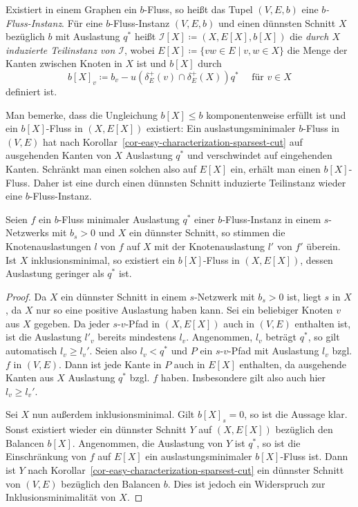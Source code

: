 
\begin{definition}
	Existiert in einem Graphen ein $b$-Fluss, so heißt das Tupel $(V, E, b)$ eine \emph{$b$-Fluss-Instanz}.
	Für eine $b$-Fluss-Instanz $(V, E, b)$ und einen dünnsten Schnitt $X$ bezüglich $b$ mit Auslastung $q^*$ heißt $\mathcal{I}[X] \coloneq (X, E[X], b[X])$ die \emph{durch $X$ induzierte Teilinstanz von $\mathcal{I}$},
	wobei $E[X] \coloneq \{ vw \in E \mid v, w \in X \}$ die Menge der Kanten zwischen Knoten in $X$ ist und $b[X]$ durch \[
	b[X]_v \coloneq b_v - u(\delta^+_E(v)\cap\delta^+_E(X)) q^* \text{~~~ für $v\in X$}
\] definiert ist.
\end{definition}

Man bemerke, dass die Ungleichung $b[X] \leq b$ komponentenweise erfüllt ist und ein $b[X]$-Fluss in $(X, E[X])$ existiert:
Ein auslastungsminimaler $b$-Fluss in $(V, E)$ hat nach Korollar~\ref{cor-easy-characterization-sparsest-cut} auf ausgehenden Kanten von $X$ Auslastung $q^*$ und verschwindet auf eingehenden Kanten.
Schränkt man einen solchen also auf $E[X]$ ein, erhält man einen $b[X]$-Fluss.
Daher ist eine durch einen dünnsten Schnitt induzierte Teilinstanz wieder eine  $b$-Fluss-Instanz.

\begin{proposition}\label{prop-restricted-minimal-flow-is-b-flow-on-induced-instance}
	Seien $f$ ein $b$-Fluss minimaler Auslastung $q^*$ einer $b$-Fluss-Instanz in einem $s$-Netzwerks mit $b_s > 0$ und $X$ ein dünnster Schnitt, so stimmen die Knotenauslastungen $l$ von $f$ auf $X$ mit der Knotenauslastung $l'$ von $f'$ überein.
	Ist $X$ inklusionsminimal, so existiert ein $b[X]$-Fluss in $(X, E[X])$, dessen Auslastung geringer als $q^*$ ist.
\end{proposition}
\begin{proof}
	Da $X$ ein dünnster Schnitt in einem $s$-Netzwerk mit $b_s > 0$ ist, liegt $s$ in $X$, da $X$ nur so eine positive Auslastung haben kann.
	Sei ein beliebiger Knoten $v$ aus $X$ gegeben.
	Da jeder $s$-$v$-Pfad in $(X, E[X])$ auch in $(V, E)$ enthalten ist, ist die Auslastung $l'_v$ bereits mindestens $l_v$.
	Angenommen, $l_v$ beträgt $q^*$, so gilt automatisch $l_v \geq l_v'$.
	Seien also $l_v < q^*$ und $P$ ein $s$-$v$-Pfad mit Auslastung $l_v$ bzgl. $f$ in $(V, E)$.
	Dann ist jede Kante in $P$ auch in $E[X]$ enthalten, da ausgehende Kanten aus $X$ Auslastung $q^*$ bzgl. $f$ haben.
	Insbesondere gilt also auch hier $l_v \geq l_v'$.
	
	Sei $X$ nun außerdem inklusionsminimal.
	Gilt $b[X]_s = 0$, so ist die Aussage klar.
	Sonst existiert wieder ein dünnster Schnitt $Y$ auf $(X, E[X])$ bezüglich den Balancen $b[X]$.
	Angenommen, die Auslastung von $Y$ ist $q^*$, so ist die Einschränkung von $f$ auf $E[X]$ ein auslastungsminimaler $b[X]$-Fluss ist.
	Dann ist $Y$ nach Korollar~\ref{cor-easy-characterization-sparsest-cut} ein dünnster Schnitt von $(V, E)$ bezüglich den Balancen $b$.
	Dies ist jedoch ein Widerspruch zur Inklusionsminimalität von $X$.
\end{proof}

